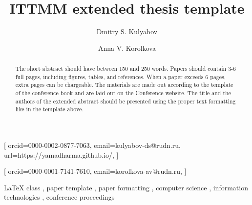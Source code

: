\documentclass[%
]{ittmm}
\begin{document}


\title{ITTMM extended thesis template}

\tnotemark[1]

\author[1,2]{Dmitry S. Kulyabov}[%
orcid=0000-0002-0877-7063,
email=kulyabov-ds@rudn.ru,
url=https://yamadharma.github.io/,
]
\cormark[1]

\author[1]{Anna V. Korolkova}[%
orcid=0000-0001-7141-7610,
email=korolkova-av@rudn.ru,
]
\address[1]{RUDN University,
  6 Miklukho-Maklaya St, Moscow, 117198, Russian Federation}
\address[2]{Joint Institute for Nuclear Research,
  6 Joliot-Curie St, Dubna, 141980, Russian Federation}


\begin{abstract}
    The short abstract should have between 150 and 250 words.
    Papers should contain 3-6 full pages, including figures, tables, and references.
    When a paper exceeds 6 pages, extra pages can be chargeable.
    The materials are made out according to the template of the conference book and are laid out on the Conference website.
    The title and the authors of the extended abstract should be presented using the proper text formatting like in the template above.
\end{abstract}

\begin{keywords}
  LaTeX class \sep
  paper template \sep
  paper formatting \sep
  computer science \sep
  information technologies \sep
  conference proceedings
\end{keywords}
\end{document}
